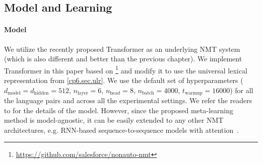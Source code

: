 
\subsection{Model and Learning}

\paragraph{Model} 

We utilize the recently proposed Transformer \citep{vaswani2017attention} as an underlying NMT system (which is also different and better than the previous chapter). We implement Transformer in this paper based on \citep{Gu2017NonAutoregressiveNM}\footnote{
    \url{https://github.com/salesforce/nonauto-nmt}
}
and modify it to use the universal lexical representation from \textsection\ref{cp6.sec.ulr}. We use the default set of hyperparameters ($d_\text{model} = d_{\text{hidden}} = 512$, $n_\text{layer}=6$, $n_\text{head}=8$, $n_\text{batch}=4000$, $t_\text{warmup} = 16000$) for all the language pairs and across all the experimental settings. We refer the readers to \citep{vaswani2017attention,Gu2017NonAutoregressiveNM} for the details of the model. However, since the proposed meta-learning method is model-agnostic, it can be easily extended to any other NMT architectures, e.g. RNN-based sequence-to-sequence models with attention~\citep{bahdanau2014neural}.







